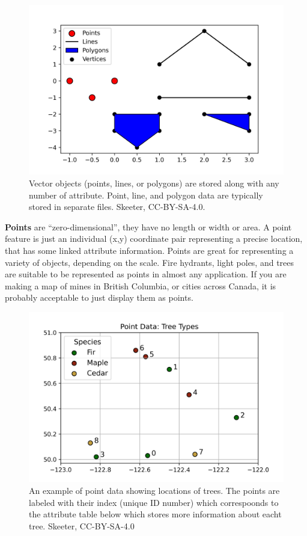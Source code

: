 \documentclass[
]{book}
\begin{document}
\begin{figure}
\includegraphics[width=0.75\linewidth]{images/03-vector-types} \caption{Vector objects (points, lines, or polygons) are stored along with any number of attribute. Point, line, and polygon data are typically stored in separate files. Skeeter, CC-BY-SA-4.0.}\label{fig:3-vector-types}
\end{figure}

\textbf{Points} are ``zero-dimensional'', they have no length or width or area. A point feature is just an individual (x,y) coordinate pair representing a precise location, that has some linked attribute information. Points are great for representing a variety of objects, depending on the scale. Fire hydrants, light poles, and trees are suitable to be represented as points in almost any application. If you are making a map of mines in British Columbia, or cities across Canada, it is probably acceptable to just display them as points.

\begin{figure}
\includegraphics[width=0.75\linewidth]{images/03-vector-points} \caption{An example of point data showing locations of trees. The points are labeled with their index (unique ID number) which correspoonds to the attribute table below which stores more information about eacht tree. Skeeter, CC-BY-SA-4.0}\label{fig:3-vector-points}
\end{figure}
\end{document}
